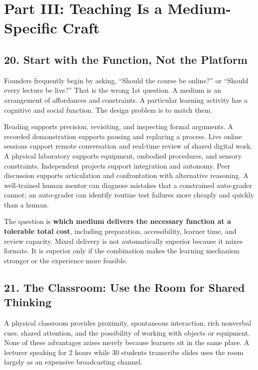 \section*{Part III: Teaching Is a Medium-Specific Craft}

\subsection*{20. Start with the Function, Not the Platform}

Founders frequently begin by asking, ``Should the course be online?'' or ``Should every lecture be live?'' That is the wrong 1st question. A medium is an arrangement of affordances and constraints. A particular learning activity has a cognitive and social function. The design problem is to match them.

Reading supports precision, revisiting, and inspecting formal arguments. A recorded demonstration supports pausing and replaying a process. Live online sessions support remote conversation and real-time review of shared digital work. A physical laboratory supports equipment, embodied procedures, and sensory constraints. Independent projects support integration and autonomy. Peer discussion supports articulation and confrontation with alternative reasoning. A well-trained human mentor can diagnose mistakes that a constrained auto-grader cannot; an auto-grader can identify routine test failures more cheaply and quickly than a human.

The question is \textbf{which medium delivers the necessary function at a tolerable total cost}, including preparation, accessibility, learner time, and review capacity. Mixed delivery is not automatically superior because it mixes formats. It is superior only if the combination makes the learning mechanism stronger or the experience more feasible.

\subsection*{21. The Classroom: Use the Room for Shared Thinking}

A physical classroom provides proximity, spontaneous interaction, rich nonverbal cues, shared attention, and the possibility of working with objects or equipment. None of these advantages arises merely because learners sit in the same place. A lecturer speaking for 2 hours while 30 students transcribe slides uses the room largely as an expensive broadcasting channel.

